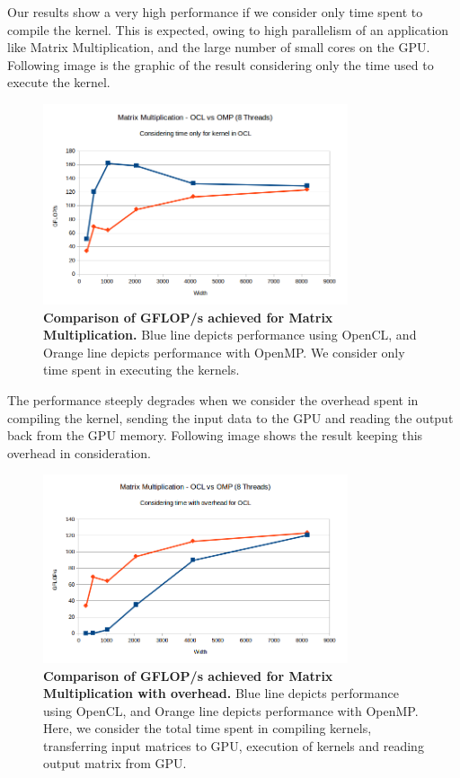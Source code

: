 \documentclass[]{scrartcl}
\begin{document}
Our results show a very  high performance if we consider only time spent to compile the kernel. This is expected, owing to high
parallelism of an application like Matrix Multiplication, and the large number of small cores on the GPU. Following image is the
graphic of the result considering only the time used to execute the kernel.

\begin{figure}[h!]
	\centering
	\includegraphics[width=0.8\textwidth]{mat_mul_ocl_vs_omp_kernel}
	\caption{\textbf{Comparison of GFLOP/s achieved for Matrix Multiplication.} Blue line depicts performance using OpenCL,
		and Orange line depicts performance with OpenMP. We consider only time spent in executing the kernels.}
\end{figure}

The performance steeply degrades when we consider the overhead spent in compiling the kernel, sending the input data to the GPU
and reading the output back from the GPU memory. Following image shows the result keeping this overhead in consideration.

\begin{figure}[h!]
	\centering
	\includegraphics[width=0.8\textwidth]{mat_mul_ocl_vs_omp_overhead}
	\caption{\textbf{Comparison of GFLOP/s achieved for Matrix Multiplication with overhead.} Blue line depicts performance using
		OpenCL, and Orange line depicts performance with OpenMP. Here, we consider the total time spent in compiling kernels,
		transferring input matrices to GPU, execution of kernels and reading output matrix from GPU.}
\end{figure}
\end{document}

